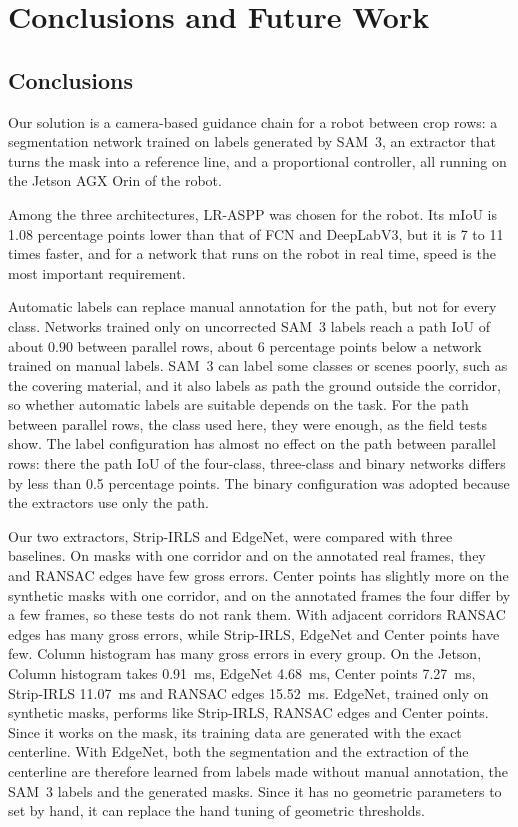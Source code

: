 
\chapter{Conclusions and Future Work}
\label{cap:conclusions}

\section{Conclusions}
\label{sec:conclusions}

Our solution is a camera-based guidance chain for a robot between crop rows: a segmentation network trained on labels generated by SAM~3, an extractor that turns the mask into a reference line, and a proportional controller, all running on the Jetson AGX Orin of the robot.

Among the three architectures, LR-ASPP was chosen for the robot. Its mIoU is 1.08 percentage points lower than that of FCN and DeepLabV3, but it is 7 to 11 times faster, and for a network that runs on the robot in real time, speed is the most important requirement.

Automatic labels can replace manual annotation for the path, but not for every class. Networks trained only on uncorrected SAM~3 labels reach a path IoU of about 0.90 between parallel rows, about 6 percentage points below a network trained on manual labels. SAM~3 can label some classes or scenes poorly, such as the covering material, and it also labels as path the ground outside the corridor, so whether automatic labels are suitable depends on the task. For the path between parallel rows, the class used here, they were enough, as the field tests show. The label configuration has almost no effect on the path between parallel rows: there the path IoU of the four-class, three-class and binary networks differs by less than 0.5 percentage points. The binary configuration was adopted because the extractors use only the path.

Our two extractors, Strip-IRLS and EdgeNet, were compared with three baselines. On masks with one corridor and on the annotated real frames, they and RANSAC edges have few gross errors. Center points has slightly more on the synthetic masks with one corridor, and on the annotated frames the four differ by a few frames, so these tests do not rank them. With adjacent corridors RANSAC edges has many gross errors, while Strip-IRLS, EdgeNet and Center points have few. Column histogram has many gross errors in every group. On the Jetson, Column histogram takes 0.91~ms, EdgeNet 4.68~ms, Center points 7.27~ms, Strip-IRLS 11.07~ms and RANSAC edges 15.52~ms. EdgeNet, trained only on synthetic masks, performs like Strip-IRLS, RANSAC edges and Center points. Since it works on the mask, its training data are generated with the exact centerline. With EdgeNet, both the segmentation and the extraction of the centerline are therefore learned from labels made without manual annotation, the SAM~3 labels and the generated masks. Since it has no geometric parameters to set by hand, it can replace the hand tuning of geometric thresholds.

